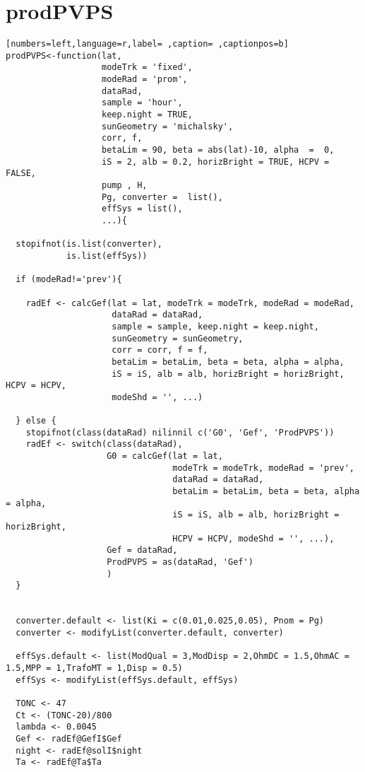 \section{prodPVPS}
\label{sec:org3c3369a}
\begin{lstlisting}[numbers=left,language=r,label= ,caption= ,captionpos=b]
prodPVPS<-function(lat, 
                   modeTrk = 'fixed', 
                   modeRad = 'prom', 
                   dataRad,
                   sample = 'hour',
                   keep.night = TRUE,
                   sunGeometry = 'michalsky',
                   corr, f,
                   betaLim = 90, beta = abs(lat)-10, alpha  =  0,
                   iS = 2, alb = 0.2, horizBright = TRUE, HCPV = FALSE,
                   pump , H, 
                   Pg, converter =  list(), 
                   effSys = list(),
                   ...){

  stopifnot(is.list(converter),
            is.list(effSys))

  if (modeRad!='prev'){ 

    radEf <- calcGef(lat = lat, modeTrk = modeTrk, modeRad = modeRad,
                     dataRad = dataRad,
                     sample = sample, keep.night = keep.night,
                     sunGeometry = sunGeometry,
                     corr = corr, f = f,
                     betaLim = betaLim, beta = beta, alpha = alpha,
                     iS = iS, alb = alb, horizBright = horizBright, HCPV = HCPV,
                     modeShd = '', ...)

  } else {
    stopifnot(class(dataRad) nilinnil c('G0', 'Gef', 'ProdPVPS'))
    radEf <- switch(class(dataRad),
                    G0 = calcGef(lat = lat, 
                                 modeTrk = modeTrk, modeRad = 'prev',
                                 dataRad = dataRad,
                                 betaLim = betaLim, beta = beta, alpha = alpha,
                                 iS = iS, alb = alb, horizBright = horizBright,
                                 HCPV = HCPV, modeShd = '', ...),
                    Gef = dataRad,
                    ProdPVPS = as(dataRad, 'Gef')
                    )
  }


  converter.default <- list(Ki = c(0.01,0.025,0.05), Pnom = Pg)
  converter <- modifyList(converter.default, converter)

  effSys.default <- list(ModQual = 3,ModDisp = 2,OhmDC = 1.5,OhmAC = 1.5,MPP = 1,TrafoMT = 1,Disp = 0.5)
  effSys <- modifyList(effSys.default, effSys)

  TONC <- 47
  Ct <- (TONC-20)/800
  lambda <- 0.0045
  Gef <- radEf@GefI$Gef
  night <- radEf@solI$night
  Ta <- radEf@Ta$Ta


\end{lstlisting}

